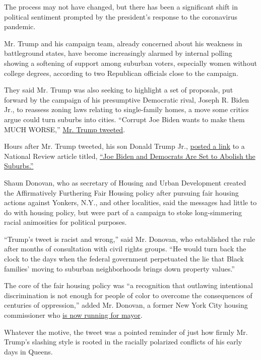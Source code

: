 The process may not have changed, but there has been a significant shift
in political sentiment prompted by the president's response to the
coronavirus pandemic.

Mr. Trump and his campaign team, already concerned about his weakness in
battleground states, have become increasingly alarmed by internal
polling showing a softening of support among suburban voters, especially
women without college degrees, according to two Republican officials
close to the campaign.

They said Mr. Trump was also seeking to highlight a set of proposals,
put forward by the campaign of his presumptive Democratic rival, Joseph
R. Biden Jr., to reassess zoning laws relating to single-family homes, a
move some critics argue could turn suburbs into cities. ``Corrupt Joe
Biden wants to make them MUCH WORSE,''
\href{https://twitter.com/realDonaldTrump/status/1278136326647406593}{Mr.
Trump tweeted}.

Hours after Mr. Trump tweeted, his son Donald Trump Jr.,
\href{https://twitter.com/DonaldJTrumpJr/status/1278313243996377095}{posted
a link} to a National Review article titled,
\href{https://www.nationalreview.com/corner/biden-and-dems-are-set-to-abolish-the-suburbs/}{``Joe
Biden and Democrats Are Set to Abolish the Suburbs.''}

Shaun Donovan, who as secretary of Housing and Urban Development created
the Affirmatively Furthering Fair Housing policy after pursuing fair
housing actions against Yonkers, N.Y., and other localities, said the
messages had little to do with housing policy, but were part of a
campaign to stoke long-simmering racial animosities for political
purposes.

``Trump's tweet is racist and wrong,'' said Mr. Donovan, who established
the rule after months of consultation with civil rights groups. ``He
would turn back the clock to the days when the federal government
perpetuated the lie that Black families' moving to suburban
neighborhoods brings down property values.''

The core of the fair housing policy was ``a recognition that outlawing
intentional discrimination is not enough for people of color to overcome
the consequences of centuries of oppression,'' added Mr. Donovan, a
former New York City housing commissioner who
\href{https://www.nytimes.com/2020/02/03/nyregion/shaun-donovan-mayor-nyc.html}{is
now running for mayor}.

Whatever the motive, the tweet was a pointed reminder of just how firmly
Mr. Trump's slashing style is rooted in the racially polarized conflicts
of his early days in Queens.

